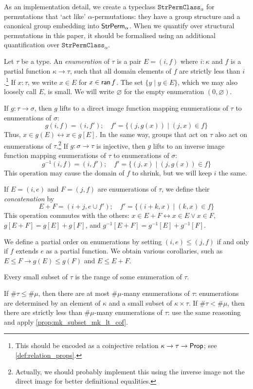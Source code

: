 As an implementation detail, we create a typeclass \( \texttt{StrPermClass}_\alpha \) for permutations that `act like' \( \alpha \)-permutations: they have a group structure and a canonical group embedding into \( \mathsf{StrPerm}_\alpha \).
When we quantify over structural permutations in this paper, it should be formalised using an additional quantification over \( \texttt{StrPermClass}_\alpha \).
\begin{definition}[enumeration]
  \label{def:Enumeration}
  Let \( \tau \) be a type.
  An \emph{enumeration} of \( \tau \) is a pair \( E = (i, f) \) where \( i : \kappa \) and \( f \) is a partial function \( \kappa \to \tau \), such that all domain elements of \( f \) are strictly less than \( i \).\footnote{This should be encoded as a coinjective relation \( \kappa \to \tau \to \mathsf{Prop} \); see \cref{def:relation_props}.}
  If \( x : \tau \), we write \( x \in E \) for \( x \in \operatorname{\mathsf{ran}} f \).
  The set \( \{ y \mid y \in E \} \), which we may also loosely call \( E \), is small.
  We will write \( \varnothing \) for the empty enumeration \( (0, \varnothing) \).

  If \( g : \tau \to \sigma \), then \( g \) lifts to a direct image function mapping enumerations of \( \tau \) to enumerations of \( \sigma \):
  \[ g(i, f) = (i, f');\quad f' = \{ (j, g(x)) \mid (j, x) \in f \} \]
  Thus, \( x \in g(E) \leftrightarrow x \in g[E] \).
  In the same way, groups that act on \( \tau \) also act on enumerations of \( \tau \).\footnote{Actually, we should probably implement this using the inverse image not the direct image for better definitional equalities.}
  If \( g : \sigma \to \tau \) is injective, then \( g \) lifts to an inverse image function mapping enumerations of \( \tau \) to enumerations of \( \sigma \):
  \[ g^{-1}(i, f) = (i, f');\quad f' = \{ (j, x) \mid (j, g(x)) \in f \} \]
  This operation may cause the domain of \( f \) to shrink, but we will keep \( i \) the same.

  If \( E = (i, e) \) and \( F = (j, f) \) are enumerations of \( \tau \), we define their \emph{concatenation} by
  \[ E + F = (i + j, e \cup f');\quad f' = \{(i + k, x) \mid (k, x) \in f \} \]
  This operation commutes with the others: \( x \in E + F \leftrightarrow x \in E \vee x \in F \), \( g[E + F] = g[E] + g[F] \), and \( g^{-1}[E + F] = g^{-1}[E] + g^{-1}[F] \).

  We define a partial order on enumerations by setting \( (i, e) \leq (j, f) \) if and only if \( f \) extends \( e \) as a partial function.
  We obtain various corollaries, such as \( E \leq F \to g(E) \leq g(F) \) and \( E \leq E + F \).

  Every small subset of \( \tau \) is the range of some enumeration of \( \tau \).

  If \( \#\tau \leq \#\mu \), then there are at most \( \#\mu \)-many enumerations of \( \tau \): enumerations are determined by an element of \( \kappa \) and a small subset of \( \kappa \times \tau \).
  If \( \#\tau < \#\mu \), then there are strictly less than \( \#\mu \)-many enumerations of \( \tau \): use the same reasoning and apply \cref{prop:mk_subset_mk_lt_cof}.
\end{definition}
